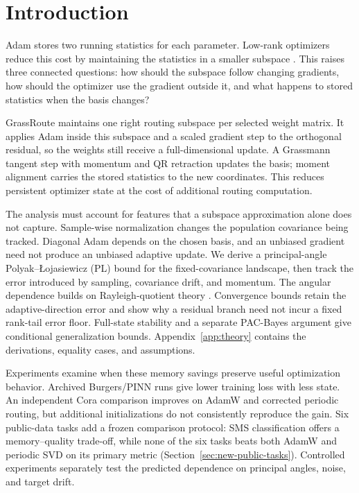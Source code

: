 \section{Introduction}
Adam stores two running statistics for each parameter. Low-rank optimizers reduce this cost by maintaining the statistics in a smaller subspace \cite{zhao2024galore,hao2024flora,chen2024fira,zhu2024apollo,liang2024osd,robert2024ldadam,rajabi2025subtrackpp}. This raises three connected questions: how should the subspace follow changing gradients, how should the optimizer use the gradient outside it, and what happens to stored statistics when the basis changes?

GrassRoute maintains one right routing subspace per selected weight matrix. It applies Adam inside this subspace and a scaled gradient step to the orthogonal residual, so the weights still receive a full-dimensional update. A Grassmann tangent step with momentum and QR retraction updates the basis; moment alignment carries the stored statistics to the new coordinates. This reduces persistent optimizer state at the cost of additional routing computation.

The analysis must account for features that a subspace approximation alone does not capture. Sample-wise normalization changes the population covariance being tracked. Diagonal Adam depends on the chosen basis, and an unbiased gradient need not produce an unbiased adaptive update. We derive a principal-angle Polyak--\L{}ojasiewicz (PL) bound for the fixed-covariance landscape, then track the error introduced by sampling, covariance drift, and momentum. The angular dependence builds on Rayleigh-quotient theory \cite{alimisis2024geodesic}. Convergence bounds retain the adaptive-direction error and show why a residual branch need not incur a fixed rank-tail error floor. Full-state stability and a separate PAC-Bayes argument give conditional generalization bounds. Appendix~\ref{app:theory} contains the derivations, equality cases, and assumptions.

Experiments examine when these memory savings preserve useful optimization behavior. Archived Burgers/PINN runs give lower training loss with less state. An independent Cora comparison improves on AdamW and corrected periodic routing, but additional initializations do not consistently reproduce the gain. Six public-data tasks add a frozen comparison protocol: SMS classification offers a memory--quality trade-off, while none of the six tasks beats both AdamW and periodic SVD on its primary metric (Section~\ref{sec:new-public-tasks}). Controlled experiments separately test the predicted dependence on principal angles, noise, and target drift.

